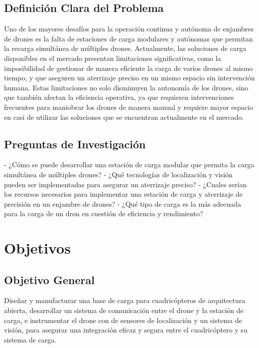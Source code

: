 \subsection{Definición Clara del Problema}

Uno de los mayores desafíos para la operación continua y autónoma de enjambres de drones es la falta de estaciones de carga modulares y autónomas que permitan la recarga simultánea de múltiples drones. Actualmente, las soluciones de carga disponibles en el mercado presentan limitaciones significativas, como la imposibilidad de gestionar de manera eficiente la carga de varios drones al mismo tiempo, y que aseguren un aterrizaje preciso en un mismo espacio sin intervención humana. Estas limitaciones no solo disminuyen la autonomía de los drones, sino que también afectan la eficiencia operativa, ya que requieren intervenciones frecuentes para maniobrar los drones de manera manual y requiere mayor espacio en casi de utilizar las soluciones que se encuentran actualmente en el mercado.
\subsection{Preguntas de Investigación}

- ¿Cómo se puede desarrollar una estación de carga modular que permita la carga simultánea de múltiples drones?
- ¿Qué tecnologías de localización y visión pueden ser implementadas para asegurar un aterrizaje preciso?
- ¿Cuales serían los recursos necesarios para implementar una estación de carga y aterrizaje de precisión en un enjambre de drones?
- ¿Qué tipo de carga es la más adecuada para la carga de un dron en cuestión de eficiencia y rendimiento?

\section{Objetivos}

\subsection{Objetivo General}

Diseñar y manufacturar una base de carga para cuadricópteros de arquitectura abierta, desarrollar un sistema de comunicación entre el drone y la estación de carga, e instrumentar el drone con de sensores de localización y un sistema de visión, para asegurar una integración eficaz y segura entre el cuadricóptero y su sistema de carga.

